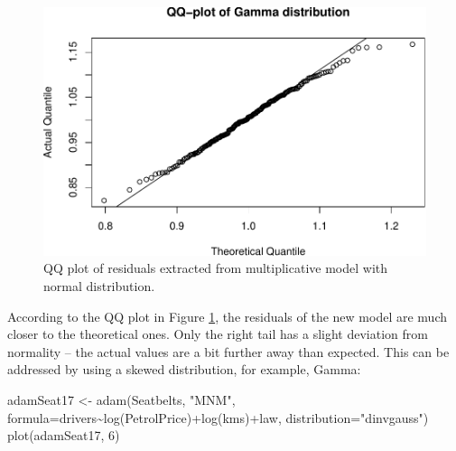 \documentclass[
]{book}
\newenvironment{Shaded}{\begin{snugshade}}{\end{snugshade}}
\newcommand{\AttributeTok}[1]{\textcolor[rgb]{0.77,0.63,0.00}{#1}}
\newcommand{\DecValTok}[1]{\textcolor[rgb]{0.00,0.00,0.81}{#1}}
\newcommand{\FunctionTok}[1]{\textcolor[rgb]{0.00,0.00,0.00}{#1}}
\newcommand{\NormalTok}[1]{#1}
\newcommand{\OtherTok}[1]{\textcolor[rgb]{0.56,0.35,0.01}{#1}}
\newcommand{\SpecialCharTok}[1]{\textcolor[rgb]{0.00,0.00,0.00}{#1}}
\newcommand{\StringTok}[1]{\textcolor[rgb]{0.31,0.60,0.02}{#1}}
\theoremstyle{definition}
\theoremstyle{definition}
\theoremstyle{definition}
\theoremstyle{definition}
\theoremstyle{remark}
\begin{document}
\begin{figure}
\centering
\includegraphics{Svetunkov--2022----ADAM_files/figure-latex/adamSeat16QQ-1.pdf}
\caption{\label{fig:adamSeat16QQ}QQ plot of residuals extracted from multiplicative model with normal distribution.}
\end{figure}

According to the QQ plot in Figure \ref{fig:adamSeat16QQ}, the residuals of the new model are much closer to the theoretical ones. Only the right tail has a slight deviation from normality -- the actual values are a bit further away than expected. This can be addressed by using a skewed distribution, for example, Gamma:

\begin{Shaded}
\begin{Highlighting}[]
\NormalTok{adamSeat17 }\OtherTok{\textless{}{-}} \FunctionTok{adam}\NormalTok{(Seatbelts, }\StringTok{"MNM"}\NormalTok{,}
                   \AttributeTok{formula=}\NormalTok{drivers}\SpecialCharTok{\textasciitilde{}}\FunctionTok{log}\NormalTok{(PetrolPrice)}\SpecialCharTok{+}\FunctionTok{log}\NormalTok{(kms)}\SpecialCharTok{+}\NormalTok{law,}
                   \AttributeTok{distribution=}\StringTok{"dinvgauss"}\NormalTok{)}
\FunctionTok{plot}\NormalTok{(adamSeat17, }\DecValTok{6}\NormalTok{)}
\end{Highlighting}
\end{Shaded}
\end{document}
